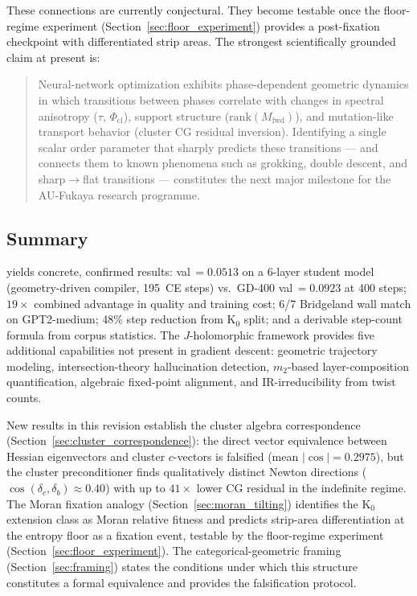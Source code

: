\documentclass[11pt]{amsart}
\begin{document}
These connections are currently conjectural.
They become testable once the floor-regime experiment
(Section~\ref{sec:floor_experiment}) provides a post-fixation
checkpoint with differentiated strip areas.
The strongest scientifically grounded claim at present is:

\begin{quote}
Neural-network optimization exhibits phase-dependent geometric
dynamics in which transitions between phases correlate with changes
in spectral anisotropy ($\tau$, $\Phi_\mathrm{cl}$), support
structure ($\mathrm{rank}(M_\mathrm{fwd})$), and mutation-like
transport behavior (cluster CG residual inversion).
Identifying a single scalar order parameter that sharply predicts
these transitions --- and connects them to known phenomena such as
grokking, double descent, and sharp$\to$flat transitions ---
constitutes the next major milestone for the AU-Fukaya research
programme.
\end{quote}

\subsection{Summary}

yields concrete, confirmed results:
val\,$=0.0513$ on a 6-layer student model (geometry-driven compiler,
195~CE steps) vs.\ GD-400 val\,$=0.0923$ at 400 steps;
$19\times$ combined advantage in quality and training cost;
6/7 Bridgeland wall match on GPT2-medium;
48\% step reduction from K$_0$ split;
and a derivable step-count formula from corpus statistics.
The $J$-holomorphic framework provides five additional capabilities
not present in gradient descent: geometric trajectory modeling,
intersection-theory hallucination detection, $m_2$-based
layer-composition quantification, algebraic fixed-point alignment,
and IR-irreducibility from twist counts.

New results in this revision establish the cluster algebra
correspondence (Section~\ref{sec:cluster_correspondence}):
the direct vector equivalence between Hessian eigenvectors and
cluster $c$-vectors is falsified (mean $|\cos|=0.2975$),
but the cluster preconditioner finds qualitatively distinct Newton
directions ($\cos(\delta_c,\delta_b) \approx 0.40$) with up to
$41\times$ lower CG residual in the indefinite regime.
The Moran fixation analogy (Section~\ref{sec:moran_tilting})
identifies the K$_0$ extension class as Moran relative fitness
and predicts strip-area differentiation at the entropy floor as
a fixation event, testable by the floor-regime experiment
(Section~\ref{sec:floor_experiment}).
The categorical-geometric framing (Section~\ref{sec:framing})
states the conditions under which this structure constitutes
a formal equivalence and provides the falsification protocol.
\end{document}
